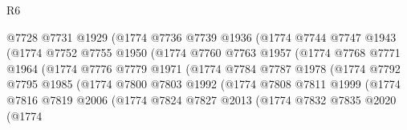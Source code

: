 \begin{lexlean}{R6}
\begin{coremodule}
                            @7728
                            @7731
                            @1929
                            (@1774
                              @7736
                              @7739
                              @1936
                              (@1774
                                @7744
                                @7747
                                @1943
                                (@1774
                                  @7752
                                  @7755
                                  @1950
                                  (@1774
                                    @7760
                                    @7763
                                    @1957
                                    (@1774
                                      @7768
                                      @7771
                                      @1964
                                      (@1774
                                        @7776
                                        @7779
                                        @1971
                                        (@1774
                                          @7784
                                          @7787
                                          @1978
                                          (@1774
                                            @7792
                                            @7795
                                            @1985
                                            (@1774
                                              @7800
                                              @7803
                                              @1992
                                              (@1774
                                                @7808
                                                @7811
                                                @1999
                                                (@1774
                                                  @7816
                                                  @7819
                                                  @2006
                                                  (@1774
                                                    @7824
                                                    @7827
                                                    @2013
                                                    (@1774
                                                      @7832
                                                      @7835
                                                      @2020
                                                      (@1774

\end{coremodule}
\end{lexlean}
